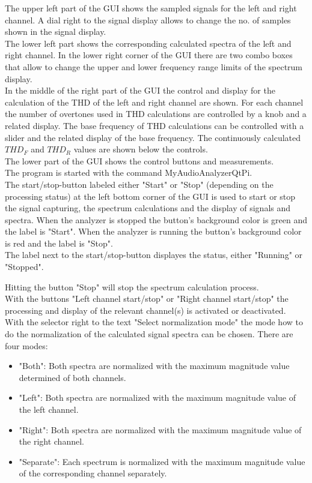 \documentclass[11pt, oneside]{scrartcl}   	%
\begin{document}
The upper left part of the GUI shows the sampled signals for the left and right channel. A dial right to the signal display allows to change the no. of samples shown in the signal display.\\
The lower left part shows the corresponding calculated spectra of the left and right channel. In the lower right corner of the GUI there are two combo boxes that allow to change the upper and lower frequency range limits of the spectrum display.\\
In the middle of the right part of the GUI the control and display for the calculation of the THD of the left and right channel are shown. For each channel the number of overtones used in THD calculations are controlled by a knob and a related display. The base frequency of THD calculations can be controlled with a slider and the related display of the base frequency. The continuously calculated $THD_F$ and $THD_R$ values are shown below the controls. \\
The lower part of the GUI shows the control buttons and measurements.\\

The program is started with the command MyAudioAnalyzerQtPi.\\

The start/stop-button labeled either "Start" or "Stop" (depending on the processing status) at the left bottom corner of the GUI is used to start or stop the signal capturing, the spectrum calculations and the display of signals and spectra.
When the analyzer is stopped the button's background color is green and the label is "Start". When the analyzer is running the button's background color is red and the label is "Stop".\\

The label next to the start/stop-button displayes the status, either "Running" or "Stopped".
 
Hitting the button "Stop" will stop the spectrum calculation process.\\

With the buttons "Left channel start/stop" or "Right channel start/stop" the processing and display of the relevant channel(s) is activated or deactivated.\\

With the selector right to the text "Select normalization mode" the mode how to do the normalization of the
calculated signal spectra can be chosen. There are four modes:
\begin{itemize}
	\item "Both": Both spectra are normalized with the maximum magnitude value determined of both channels.
	\item "Left": Both spectra are normalized with the maximum magnitude value of the left channel.
	\item "Right": Both spectra are normalized with the maximum magnitude value of the right channel.
	\item "Separate": Each spectrum is normalized with the maximum magnitude value of the corresponding channel separately.
\end{itemize}
\end{document}
